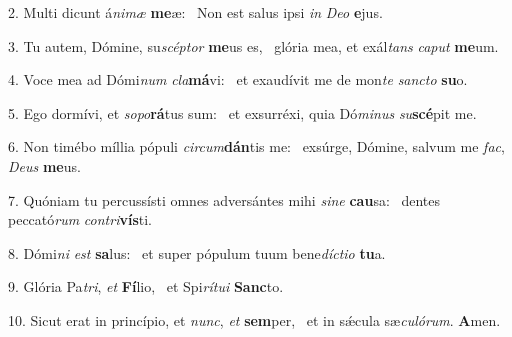 2. Multi dicunt á\textit{ni}\textit{mæ} \textbf{me}æ: \ast\  Non est salus ipsi \textit{in} \textit{De}\textit{o} \textbf{e}jus.\

3. Tu autem, Dómine, su\textit{scép}\textit{tor} \textbf{me}us es, \ast\  glória mea, et exál\textit{tans} \textit{ca}\textit{put} \textbf{me}um.\

4. Voce mea ad Dómi\textit{num} \textit{cla}\textbf{má}vi: \ast\  et exaudívit me de mon\textit{te} \textit{sanc}\textit{to} \textbf{su}o.\

5. Ego dormívi, et \textit{so}\textit{po}\textbf{rá}tus sum: \ast\  et exsurréxi, quia Dó\textit{mi}\textit{nus} \textit{su}\textbf{scé}pit me.\

6. Non timébo míllia pópuli \textit{cir}\textit{cum}\textbf{dán}tis me: \ast\  exsúrge, Dómine, salvum me \textit{fac}, \textit{De}\textit{us} \textbf{me}us.\

7. Quóniam tu percussísti omnes adversántes mihi \textit{si}\textit{ne} \textbf{cau}sa: \ast\  dentes peccató\textit{rum} \textit{con}\textit{tri}\textbf{vís}ti.\

8. Dómi\textit{ni} \textit{est} \textbf{sa}lus: \ast\  et super pópulum tuum bene\textit{díc}\textit{ti}\textit{o} \textbf{tu}a.\

9. Glória Pa\textit{tri}, \textit{et} \textbf{Fí}lio, \ast\  et Spi\textit{rí}\textit{tu}\textit{i} \textbf{Sanc}to.\

10. Sicut erat in princípio, et \textit{nunc}, \textit{et} \textbf{sem}per, \ast\  et in sǽcula sæ\textit{cu}\textit{ló}\textit{rum}. \textbf{A}men.\

